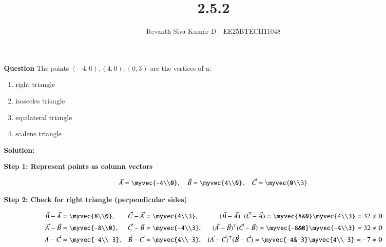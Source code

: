 \documentclass[journal]{IEEEtran}
\begin{document}


\title{2.5.2}
\author{Revanth Siva Kumar D - EE25BTECH11048
}
{\let\newpage\relax\maketitle}

\textbf{Question} 
The points $(-4,0), (4,0), (0,3)$ are the vertices of a:
\begin{enumerate}[label=(\alph*)]
    \item right triangle
    \item isosceles triangle
    \item equilateral triangle
    \item scalene triangle
\end{enumerate}

\textbf{Solution:} 

\textbf{Step 1: Represent points as column vectors}


\begin{align}
\vec{A} = \myvec{-4\\0}, \quad 
\vec{B} = \myvec{4\\0}, \quad 
\vec{C} = \myvec{0\\3}
\end{align}

\textbf{Step 2: Check for right triangle (perpendicular sides)}


\begin{align}
\vec{B}-\vec{A} &= \myvec{8\\0}, &
\vec{C}-\vec{A} &= \myvec{4\\3}, &
(\vec{B}-\vec{A})^\top (\vec{C}-\vec{A}) = \myvec{8&0}\myvec{4\\3} = 32 \neq 0 \\
\vec{A}-\vec{B} &= \myvec{-8\\0}, &
\vec{C}-\vec{B} &= \myvec{-4\\3}, &
(\vec{A}-\vec{B})^\top (\vec{C}-\vec{B}) = \myvec{-8&0}\myvec{-4\\3} = 32 \neq 0 \\
\vec{A}-\vec{C} &= \myvec{-4\\-3}, &
\vec{B}-\vec{C} &= \myvec{4\\-3}, &
(\vec{A}-\vec{C})^\top (\vec{B}-\vec{C}) = \myvec{-4&-3}\myvec{4\\-3} = -7 \neq 0
\end{align}
\end{document}
